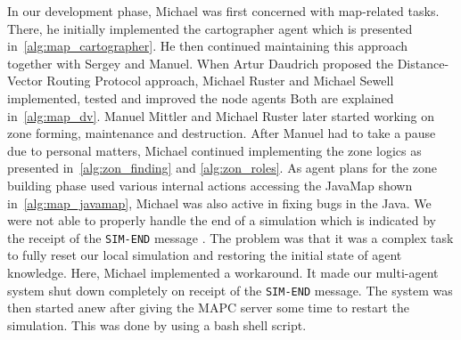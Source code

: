 In our development phase, Michael was first concerned with map-related tasks.
There, he initially implemented the cartographer agent which is presented in~\autoref{alg:map_cartographer}. %
He then continued maintaining this approach together with Sergey and Manuel.
When Artur Daudrich proposed the Distance-Vector Routing Protocol approach, Michael Ruster and Michael Sewell implemented, tested and improved the node agents
Both are explained in~\autoref{alg:map_dv}. %
Manuel Mittler and Michael Ruster later started working on zone forming, maintenance and destruction. %
After Manuel had to take a pause due to personal matters, Michael continued implementing the zone logics as presented in~\autoref{alg:zon_finding} and \autoref{alg:zon_roles}.
As agent plans for the zone building phase used various internal actions accessing the JavaMap shown in~\ref{alg:map_javamap}, Michael was also active in fixing bugs in the Java.
We were not able to properly handle the end of a simulation which is indicated by the receipt of the \texttt{SIM-END} message \cite{ahlbrecht_protocol_2014}.
The problem was that it was a complex task to fully reset our local simulation and restoring the initial state of agent knowledge.
Here, Michael implemented a workaround.
It made our multi-agent system shut down completely on receipt of the \texttt{SIM-END} message.
The system was then started anew after giving the MAPC server some time to restart the simulation.
This was done by using a bash shell script.
